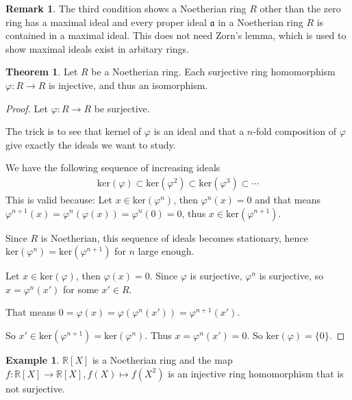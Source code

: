 \documentclass[a4paper]{book}
\theoremstyle{definition}
\newtheorem{example}{Example}[definition]
\newtheorem{theorem}[definition]{Theorem}
\newtheorem*{remark}{Remark}
\begin{document}
\begin{rembox}
    \begin{remark}
        The third condition shows a Noetherian ring \(R\) other than the zero ring has a maximal ideal and every proper ideal \(\mathfrak{a}\) in a Noetherian ring \(R\) is contained in a maximal ideal. This does not need Zorn's lemma, which is used to show maximal ideals exist in arbitary rings.
    \end{remark}
\end{rembox}
\begin{thmbox}
    \begin{theorem}
        Let \(R\) be a Noetherian ring. Each surjective ring homomorphism \(\varphi: R \longrightarrow R\) is injective, and thus an isomorphism.
    \end{theorem}
\end{thmbox}
\begin{proof}
    Let \(\varphi: R \longrightarrow R\) be surjective.
    
    The trick is to see that kernel of \(\varphi\) is an ideal and that a \(n\)-fold composition of \(\varphi\) give exactly the ideals we want to study.

    We have the following sequence of increasing ideals
    \begin{align*}
        \text{ker}(\varphi) \subset \text{ker}(\varphi^2) \subset \text{ker}(\varphi^3) \subset \cdots
    \end{align*}
    This is valid because: Let \(x \in \text{ker}(\varphi^n)\), then \(\varphi^n(x) = 0\) and that means \(\varphi^{n+1}(x) = \varphi^n(\varphi(x)) = \varphi^{n}(0) = 0\), thus \(x \in \text{ker}(\varphi^{n+1})\).

    Since \(R\) is Noetherian, this sequence of ideals becomes stationary, hence \(\text{ker}(\varphi^{n}) = \text{ker}(\varphi^{n+1})\) for \(n\) large enough.

    Let \(x \in \text{ker}(\varphi)\), then \(\varphi(x) = 0\). Since \(\varphi\) is surjective, \(\varphi^n\) is surjective, so \(x = \varphi^n(x')\) for some \(x' \in R\).

    That means \(0 = \varphi(x) = \varphi(\varphi^{n}(x')) = \varphi^{n+1}(x')\).

    So \(x' \in \text{ker}(\varphi^{n+1}) = \text{ker}(\varphi^{n})\). Thus \(x = \varphi^{n}(x') = 0\). So \(\text{ker}(\varphi) = \{0\}\).
\end{proof}

\begin{exmbox}
    \begin{example}
        \(\mathbb{R}[X]\) is a Noetherian ring and the map \(f: \mathbb{R}[X] \longrightarrow \mathbb{R}[X], f(X) \mapsto f(X^2)\) is an injective ring homomorphism that is not surjective.
    \end{example}
\end{exmbox}
\end{document}

